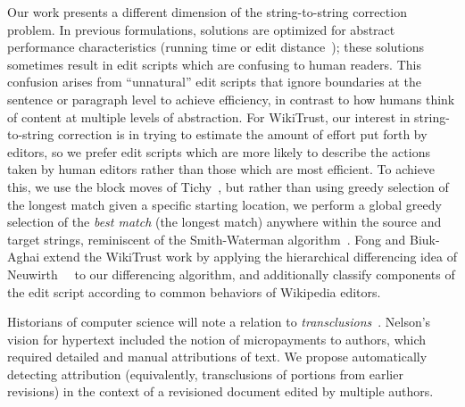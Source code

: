 Our work presents a different
dimension of the string-to-string correction problem.
In previous formulations, solutions are optimized for abstract
performance characteristics (\eg running time or
edit distance~\cite{Damerau1964,Levenshtein1966}); these solutions sometimes
result in edit scripts which are confusing to human readers.
This confusion arises from ``unnatural'' edit scripts that ignore boundaries
at the sentence or paragraph level to achieve efficiency, in contrast to
how humans think of content at multiple levels of abstraction.
For WikiTrust, our interest in string-to-string correction is in trying
to estimate the amount of effort put forth by editors, so we prefer edit
scripts which are more likely to describe the actions taken by human
editors rather than those which are most efficient.
To achieve this, we use the block moves of Tichy~\cite{Tichy1984}, but rather
than using greedy selection of the longest match given a specific
starting location, we perform a global greedy selection of the
\textit{best match} (\eg the longest match) anywhere within the
source and target strings, reminiscent of the Smith-Waterman
algorithm~\cite{Smith1981}.
Fong and Biuk-Aghai extend the WikiTrust work by applying
the hierarchical differencing idea of
Neuwirth~\etal~\cite{Neuwirth1992} to our differencing algorithm,
and additionally classify components
of the edit script according to common behaviors of Wikipedia editors.

Historians of computer science will note a relation
to \textit{transclusions}~\cite{Nelson81}.
Nelson's vision for hypertext included the notion
of micropayments to authors, which required detailed
and manual attributions of text.
We propose automatically detecting attribution
(equivalently, transclusions of portions from earlier revisions)
in the context of a revisioned document edited
by multiple authors.


